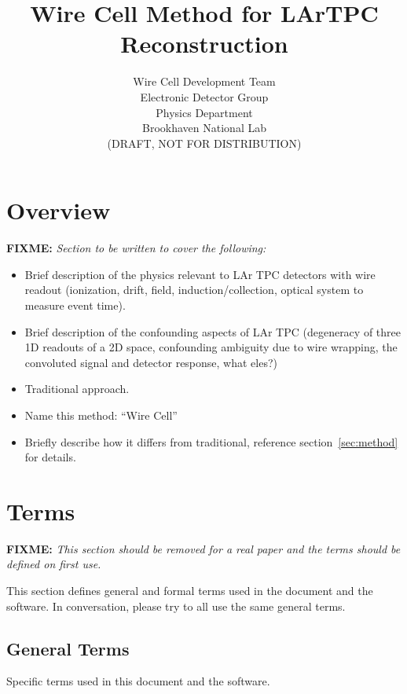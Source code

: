 \documentclass[letter]{article}
\title{Wire Cell Method for LArTPC Reconstruction}
\author{Wire Cell Development Team\\Electronic Detector
  Group\\Physics Department\\Brookhaven National Lab\\(DRAFT, NOT FOR DISTRIBUTION)}
\newcommand\fixme[1]{\textbf{FIXME:} \textit{#1}\xspace}
\begin{document}
\maketitle

\section{Overview}

\fixme{Section to be written to cover the following:}

\begin{itemize}
\item Brief description of the physics relevant to LAr TPC detectors
  with wire readout (ionization, drift, field, induction/collection,
  optical system to measure event time).
\item Brief description of the confounding aspects of LAr TPC
  (degeneracy of three 1D readouts of a 2D space, confounding
  ambiguity due to wire wrapping, the convoluted signal and detector
  response, what eles?)
\item Traditional approach.
\item Name this method: ``Wire Cell''
\item Briefly describe how it differs from traditional, reference
  section~\ref{sec:method} for details.
\end{itemize}

\section{Terms}

\fixme{This section should be removed for a real paper and the terms
  should be defined on first use.}

This section defines general and formal terms used in the document and
the software.
In conversation, please try to all use the same general terms.

\subsection{General Terms}

Specific terms used in this document and the software.
\end{document}
